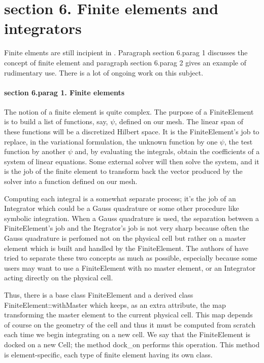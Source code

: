\section{\numb section 6. Finite elements and integrators}


Finite elments are still incipient in \maniFEM.
Paragraph \numb section 6.\numb parag 1 discusses the concept of finite element
and paragraph \numb section 6.\numb parag 2 gives an example of rudimentary use.
There is a lot of ongoing work on this subject.


\paragraph{\numb section 6.\numb parag 1. Finite elements}

The notion of a finite element is quite complex.
The purpose of a {\codett FiniteElement} is to build a list of functions, say, $ \psi $,
defined on our mesh.
The linear span of these functions will be a discretized Hilbert space.
It is the {\codett FiniteElement}'s job to replace, in the variational formulation,
the unknown function by one $ \psi $, the test function by another $ \psi $ and,
by evaluating the integrals, obtain the coefficients of a system of linear equations.
Some external solver will then solve the system, and it is the job of the finite element
to transform back the vector produced by the solver into a function defined on our mesh.

Computing each integral is a somewhat separate process; it's the job of an {\codett Integrator}
which could be a Gauss quadrature or some other procedure like symbolic integration.
When a Gauss quadrature is used, the separation between a {\codett FiniteElement}'s job
and the {\codett Itegrator}'s job is not very sharp because often the Gauss quadrature is
perfomed not on the physical cell but rather on a master element which is built and
handled by the {\codett FiniteElement}.
The authors of {\maniFEM} have tried to separate these two concepts
as much as possible, especially because some users may want to use a {\codett FiniteElement}
with no master element, or an {\codett Integrator} acting directly on the physical cell.

Thus, there is a base class {\codett FiniteElement} and a derived class
{\codett FiniteElement::withMaster} which keeps, as an extra attribute, the map transforming
the master element to the current physical cell.
This map depends of course on the geometry of the cell and thus it must be computed from
scratch each time we begin integrating on a new cell.
We say that the {\codett FiniteElement} is docked on a new {\codett Cell};
the method {\codett dock\_on} performs this operation.
This method is element-specific, each type of finite element having its own class.

